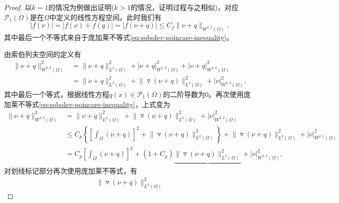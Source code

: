 \begin{proof}
  以$k=1$的情况为例做出证明($k >1$的情况，证明过程与之相似)，对应$\mathcal{P}_{1}(\Omega)$是在$\Omega$中定义的线性方程空间。此时我们有
  \begin{equation*}
    \big| f(\nu) \big| = \big| f(\nu) + f(q) \big| = \big| f(\nu + q) \big| \le C_f \big\| \nu + q \big\|_{W^{2,2}(\Omega)},
  \end{equation*}
  其中最后一个不等式来自于庞加莱不等式\eqref{eq:sobolev-poincare-inequality}。

由索伯列夫空间的定义有
\begin{equation*}
\begin{split}
    \big\| \nu + q \big\|_{W^{2,2}(\Omega)}^2 &=
    \big\| \nu + q \big\|_{L^{2}(\Omega)}^2
    + \big| \nu + q \big|_{W^{1,2}(\Omega)}^2
    + \big| \nu + q \big|_{W^{2,2}(\Omega)}^2 \\
    &= \big\| \nu + q \big\|_{L^{2}(\Omega)}^2
    + \big\| \triangledown \left( \nu + q \right) \big\|_{L^{2}(\Omega)}^2
    + \big| \nu \big|_{W^{2,2}(\Omega)}^2,
\end{split}
\end{equation*}
其中最后一个等式，根据线性方程$q(x) \in \mathcal{P}_{1}(\Omega)$的二阶导数为0。再次使用庞加莱不等式\eqref{eq:sobolev-poincare-inequality}，上式变为
\begin{equation}
  \label{eq:bramble-hilbert-middle-vq}
  \begin{split}
    \big\| \nu + q \big\|_{W^{2,2}(\Omega)}^2
    &=\big\| \nu + q \big\|_{L^{2}(\Omega)}^2
    + \big\| \triangledown \left( \nu + q \right) \big\|_{L^{2}(\Omega)}^2
    + \big| \nu \big|_{W^{2,2}(\Omega)}^2 \\
    & \le C_p \left\{
    \left[ \int_{\Omega} \left( \nu + q \right) \right]^2
    + \big\| \triangledown \left( \nu + q \right) \big\|_{L^{2}(\Omega)}^2
    \right\}
    + \big\| \triangledown \left( \nu + q \right) \big\|_{L^{2}(\Omega)}^2
    + \big| \nu \big|_{W^{2,2}(\Omega)}^2 \\
    &= C_p \left[ \int_{\Omega} \left( \nu + q \right) \right]^2
    +\left( 1+C_p \right) \underbrace{\big\| \triangledown \left( \nu + q \right) \big\|_{L^{2}(\Omega)}^2}
    +\big| \nu \big|_{W^{2,2}(\Omega)}^2,
  \end{split}
\end{equation}
对划线标记部分再次使用庞加莱不等式，有
\begin{equation*}
  \begin{split}
    \big\| \triangledown \left( \nu + q \right) \big\|_{L^{2}(\Omega)}^2

\end{split}
\end{equation*}
\end{proof}
